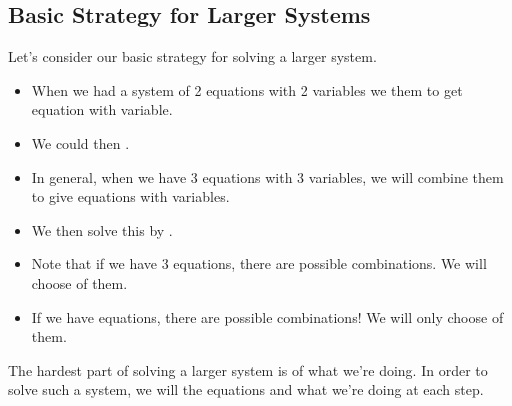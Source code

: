 \subsection{Basic Strategy for Larger Systems} 
Let's consider our basic strategy for solving a larger system.
\begin{itemize}
\item When we had a system of 2 equations with 2 variables we \makeblank[1in] them to get \makeblanksmall equation with \makeblanksmall variable.
\item We could then \makeblank[3in].
\item In general, when we have 3 equations with 3 variables, we will combine them to give \makeblanksmall equations with \makeblanksmall variables.
\item We then solve this by \makeblank.
\item Note that if we have 3 equations, there are \makeblanksmall possible combinations. We will choose \makeblanksmall of them.
\item If we have \makeblanksmall equations, there are \makeblanksmall possible combinations! We will only choose \makeblanksmall of them.
\end{itemize}
The hardest part of solving a larger system is \makeblank of what we're doing. In order to solve such a system, we will \makeblank[1in] the equations and \makeblank[1in] what we're doing at each step.
